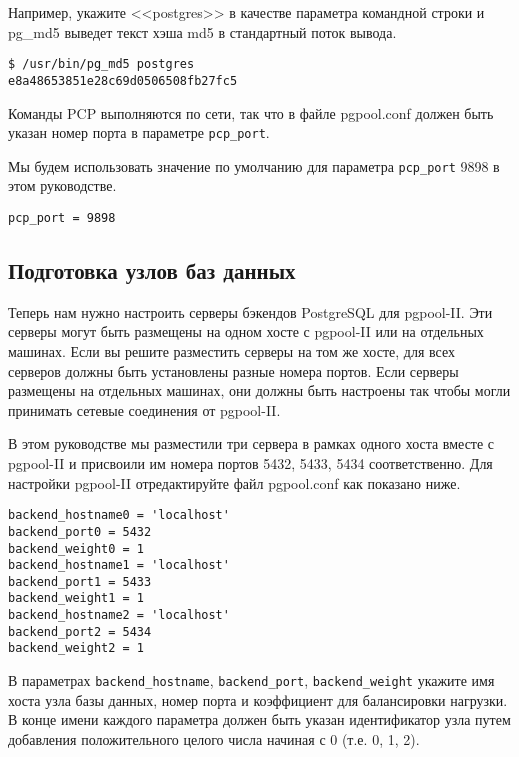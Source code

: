 Например, укажите <<postgres>> в качестве параметра командной строки и pg\_md5 выведет текст хэша md5 в стандартный поток вывода.

\begin{lstlisting}[label=lst:pgpool8,caption=Настройка команд PCP]
$ /usr/bin/pg_md5 postgres
e8a48653851e28c69d0506508fb27fc5
\end{lstlisting}

Команды PCP выполняются по сети, так что в файле pgpool.conf должен быть указан номер порта в параметре \lstinline!pcp_port!.

Мы будем использовать значение по умолчанию для параметра \lstinline!pcp_port! 9898 в этом руководстве.

\begin{lstlisting}[label=lst:pgpool9,caption=Настройка команд PCP]
pcp_port = 9898
\end{lstlisting}


\subsection{Подготовка узлов баз данных}

Теперь нам нужно настроить серверы бэкендов PostgreSQL для pgpool-II. Эти серверы могут быть размещены на одном хосте с pgpool-II или на отдельных машинах. Если вы решите разместить серверы на том же хосте, для всех серверов должны быть установлены разные номера портов. Если серверы размещены на отдельных машинах, они должны быть настроены так чтобы могли принимать сетевые соединения от pgpool-II.

В этом руководстве мы разместили три сервера в рамках одного хоста вместе с pgpool-II и присвоили им номера портов 5432, 5433, 5434 соответственно. Для настройки pgpool-II отредактируйте файл pgpool.conf как показано ниже.

\begin{lstlisting}[label=lst:pgpool10,caption=Подготовка узлов баз данных]
backend_hostname0 = 'localhost'
backend_port0 = 5432
backend_weight0 = 1
backend_hostname1 = 'localhost'
backend_port1 = 5433
backend_weight1 = 1
backend_hostname2 = 'localhost'
backend_port2 = 5434
backend_weight2 = 1
\end{lstlisting}

В параметрах \lstinline!backend_hostname!, \lstinline!backend_port!, \lstinline!backend_weight! укажите имя хоста узла базы данных, номер порта и коэффициент для балансировки нагрузки. В конце имени каждого параметра должен быть указан идентификатор узла путем добавления положительного целого числа начиная с 0 (т.е. 0, 1, 2).

